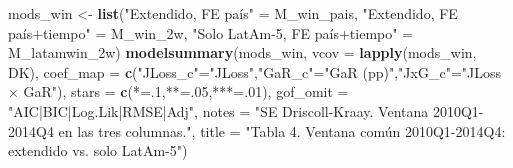 \documentclass[
]{article}
\newenvironment{Shaded}{\begin{snugshade}}{\end{snugshade}}
\newcommand{\AttributeTok}[1]{\textcolor[rgb]{0.13,0.29,0.53}{#1}}
\newcommand{\DecValTok}[1]{\textcolor[rgb]{0.00,0.00,0.81}{#1}}
\newcommand{\FunctionTok}[1]{\textcolor[rgb]{0.13,0.29,0.53}{\textbf{#1}}}
\newcommand{\NormalTok}[1]{#1}
\newcommand{\OtherTok}[1]{\textcolor[rgb]{0.56,0.35,0.01}{#1}}
\newcommand{\StringTok}[1]{\textcolor[rgb]{0.31,0.60,0.02}{#1}}
\begin{document}
\begin{Shaded}
\begin{Highlighting}[]
\NormalTok{mods\_win }\OtherTok{\textless{}{-}} \FunctionTok{list}\NormalTok{(}\StringTok{"Extendido, FE país"} \OtherTok{=}\NormalTok{ M\_win\_pais,}
                  \StringTok{"Extendido, FE país+tiempo"} \OtherTok{=}\NormalTok{ M\_win\_2w,}
                  \StringTok{"Solo LatAm{-}5, FE país+tiempo"} \OtherTok{=}\NormalTok{ M\_latamwin\_2w)}
\FunctionTok{modelsummary}\NormalTok{(mods\_win, }\AttributeTok{vcov =} \FunctionTok{lapply}\NormalTok{(mods\_win, DK),}
  \AttributeTok{coef\_map =} \FunctionTok{c}\NormalTok{(}\StringTok{"JLoss\_c"}\OtherTok{=}\StringTok{"JLoss"}\NormalTok{,}\StringTok{"GaR\_c"}\OtherTok{=}\StringTok{"GaR (pp)"}\NormalTok{,}\StringTok{"JxG\_c"}\OtherTok{=}\StringTok{"JLoss × GaR"}\NormalTok{),}
  \AttributeTok{stars =} \FunctionTok{c}\NormalTok{(}\StringTok{\textquotesingle{}*\textquotesingle{}}\OtherTok{=}\NormalTok{.}\DecValTok{1}\NormalTok{,}\StringTok{\textquotesingle{}**\textquotesingle{}}\OtherTok{=}\NormalTok{.}\DecValTok{05}\NormalTok{,}\StringTok{\textquotesingle{}***\textquotesingle{}}\OtherTok{=}\NormalTok{.}\DecValTok{01}\NormalTok{), }\AttributeTok{gof\_omit =} \StringTok{"AIC|BIC|Log.Lik|RMSE|Adj"}\NormalTok{,}
  \AttributeTok{notes =} \StringTok{"SE Driscoll{-}Kraay. Ventana 2010Q1{-}2014Q4 en las tres columnas."}\NormalTok{,}
  \AttributeTok{title =} \StringTok{"Tabla 4. Ventana común 2010Q1{-}2014Q4: extendido vs. solo LatAm{-}5"}\NormalTok{)}
\end{Highlighting}
\end{Shaded}
\end{document}
